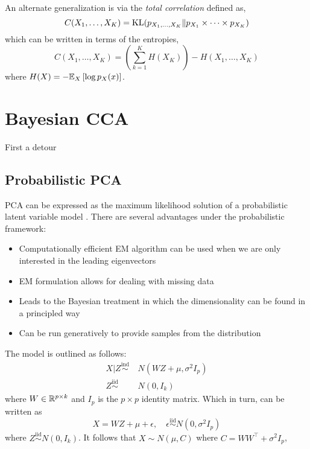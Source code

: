\documentclass[12pt]{article}
\begin{document}
An alternate generalization is via the \textit{total correlation} defined as,
\begin{equation}
    C(X_1, \dots, X_K) = \text{KL} ( p_{X_1, \dots, X_K} \| p_{X_1} \times \cdots \times p_{X_K} )
\end{equation}
which can be written in terms of the entropies,
\begin{equation}
    C(X_1, \dots, X_K) = \left( \sum_{k=1}^{K} H(X_K) \right) - H(X_1, \dots, X_K)
\end{equation}
where $H (X) = - \mathbb{E}_X \left[\log p_X(x) \right]$.

\newpage
\section{Bayesian CCA}

First a detour

\subsection{Probabilistic PCA}

PCA can be expressed as the maximum likelihood solution of a probabilistic latent variable model \citep{Tipping1999, Bishop2006}. There are several advantages under the probabilistic framework:
\begin{itemize}
    \item Computationally efficient EM algorithm can be used when we are only interested in the leading eigenvectors
    \item EM formulation allows for dealing with missing data
    \item Leads to the Bayesian treatment in which the dimensionality can be found in a principled way
    \item Can be run generatively to provide samples from the distribution
\end{itemize}
The model is outlined as follows:
\begin{equation} \label{eq:ppca} 
\begin{aligned}
    X | Z \overset{\text{ind}}{\sim} &\ N(WZ + \mu, \sigma^2 I_p) \\
    Z \overset{\text{iid}}{\sim} &\ N(0, I_k)
\end{aligned}
\end{equation}
where $W \in \mathbb{R}^{p \times k}$ and $I_p$ is the $p \times p$ identity matrix. Which in turn, can be written as
\begin{equation} \label{eq:ppca_gen} 
    X = WZ + \mu + \epsilon, \quad \epsilon \overset{\text{iid}}{\sim} N(0, \sigma^2 I_p)
\end{equation}
where $ Z \overset{\text{iid}}{\sim} N(0, I_k) $. It follows that $X \sim N(\mu, C)$ where $C = WW^\top + \sigma^2I_p$, 
\end{document}
